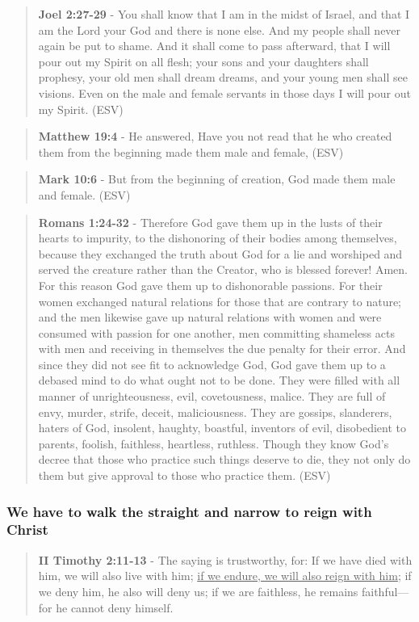\documentclass[11pt]{article}
\begin{document}
\begin{quote}
\textbf{Joel 2:27-29} - You shall know that I am in the midst of Israel, and that I am the Lord your God and there is none else. And my people shall never again be put to shame. And it shall come to pass afterward, that I will pour out my Spirit on all flesh; your sons and your daughters shall prophesy, your old men shall dream dreams, and your young men shall see visions. Even on the male and female servants in those days I will pour out my Spirit. (ESV)
\end{quote}

\begin{quote}
\textbf{Matthew 19:4} - He answered, Have you not read that he who created them from the beginning made them male and female, (ESV)
\end{quote}

\begin{quote}
\textbf{Mark 10:6} - But from the beginning of creation, God made them male and female. (ESV)
\end{quote}

\begin{quote}
\textbf{Romans 1:24-32} - Therefore God gave them up in the lusts of their hearts to impurity, to the dishonoring of their bodies among themselves, because they exchanged the truth about God for a lie and worshiped and served the creature rather than the Creator, who is blessed forever! Amen. For this reason God gave them up to dishonorable passions. For their women exchanged natural relations for those that are contrary to nature; and the men likewise gave up natural relations with women and were consumed with passion for one another, men committing shameless acts with men and receiving in themselves the due penalty for their error. And since they did not see fit to acknowledge God, God gave them up to a debased mind to do what ought not to be done. They were filled with all manner of unrighteousness, evil, covetousness, malice. They are full of envy, murder, strife, deceit, maliciousness. They are gossips, slanderers, haters of God, insolent, haughty, boastful, inventors of evil, disobedient to parents, foolish, faithless, heartless, ruthless. Though they know God's decree that those who practice such things deserve to die, they not only do them but give approval to those who practice them. (ESV)
\end{quote}

\subsubsection{We have to walk the straight and narrow to reign with Christ}
\label{sec:org4f32d9c}
\begin{quote}
\textbf{II Timothy 2:11-13} - The saying is trustworthy, for: If we have died with him, we will also live with him; \uline{if we endure, we will also reign with him}; if we deny him, he also will deny us; if we are faithless, he remains faithful— for he cannot deny himself.
\end{quote}
\end{document}
